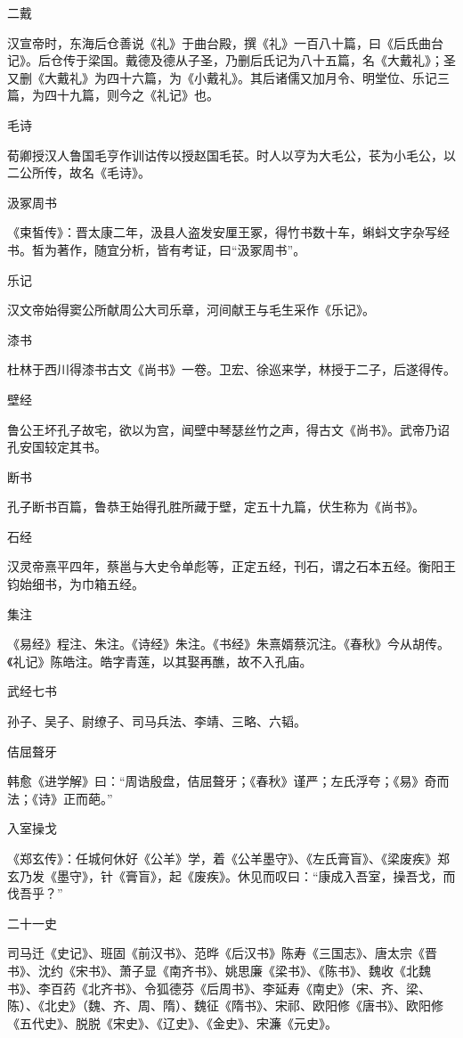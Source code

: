 \documentclass[a4paper,12pt,UTF8,twoside]{ctexbook}
\begin{document}
    二戴
    
    汉宣帝时，东海后仓善说《礼》于曲台殿，撰《礼》一百八十篇，曰《后氏曲台记》。后仓传于梁国。戴德及德从子圣，乃删后氏记为八十五篇，名《大戴礼》；圣又删《大戴礼》为四十六篇，为《小戴礼》。其后诸儒又加月令、明堂位、乐记三篇，为四十九篇，则今之《礼记》也。
    
    毛诗
    
    荀卿授汉人鲁国毛亨作训诂传以授赵国毛苌。时人以亨为大毛公，苌为小毛公，以二公所传，故名《毛诗》。
    
    汲冢周书
    
    《束皙传》：晋太康二年，汲县人盗发安厘王冢，得竹书数十车，蝌蚪文字杂写经书。皙为著作，随宜分析，皆有考证，曰“汲冢周书”。
    
    乐记
    
    汉文帝始得窦公所献周公大司乐章，河间献王与毛生采作《乐记》。
    
    漆书
    
    杜林于西川得漆书古文《尚书》一卷。卫宏、徐巡来学，林授于二子，后遂得传。
    
    壁经
    
    鲁公王坏孔子故宅，欲以为宫，闻壁中琴瑟丝竹之声，得古文《尚书》。武帝乃诏孔安国较定其书。
    
    断书
    
    孔子断书百篇，鲁恭王始得孔胜所藏于壁，定五十九篇，伏生称为《尚书》。
    
    石经
    
    汉灵帝熹平四年，蔡邕与大史令单彪等，正定五经，刊石，谓之石本五经。衡阳王钧始细书，为巾箱五经。
    
    集注
    
    《易经》程注、朱注。《诗经》朱注。《书经》朱熹婿蔡沉注。《春秋》今从胡传。《礼记》陈皓注。皓字青莲，以其娶再醮，故不入孔庙。
    
    武经七书
    
    孙子、吴子、尉缭子、司马兵法、李靖、三略、六韬。
    
    佶屈聱牙
    
    韩愈《进学解》曰：“周诰殷盘，佶屈聱牙；《春秋》谨严；左氏浮夸；《易》奇而法；《诗》正而葩。”
    
    入室操戈
    
    《郑玄传》：任城何休好《公羊》学，着《公羊墨守》、《左氏膏盲》、《梁废疾》郑玄乃发《墨守》，针《膏盲》，起《废疾》。休见而叹曰：“康成入吾室，操吾戈，而伐吾乎？”
    
    二十一史
    
    司马迁《史记》、班固《前汉书》、范晔《后汉书》陈寿《三国志》、唐太宗《晋书》、沈约《宋书》、萧子显《南齐书》、姚思廉《梁书》、《陈书》、魏收《北魏书》、李百药《北齐书》、令狐德芬《后周书》、李延寿《南史》（宋、齐、梁、陈）、《北史》（魏、齐、周、隋）、魏征《隋书》、宋祁、欧阳修《唐书》、欧阳修《五代史》、脱脱《宋史》、《辽史》、《金史》、宋濂《元史》。
    
\end{document}
